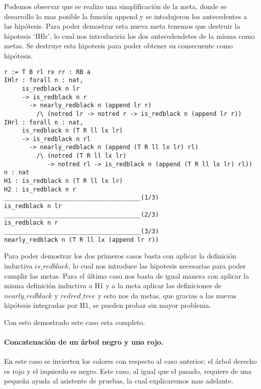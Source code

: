Podemos observar que se realizo una simplificaci\'on de la meta, donde se desarrollo lo mas
posible la funci\'on append y se intodujeron los antecedentes a las hip\'otesis. Para poder
demostrar esta nueva meta tenemos que destruir la hipotesis `IHlr', lo cual nos introduciria los
dos antecedendetes de la misma como metas. Se destruye esta hipotesis para poder obtener su consecuente como hip\'otesis.

\begin{verbatim}
r := T B rl rx rr : RB a
IHlr : forall n : nat,
     is_redblack n lr
     -> is_redblack n r
       -> nearly_redblack n (append lr r)
         /\ (notred lr -> notred r -> is_redblack n (append lr r))
IHrl : forall n : nat,
     is_redblack n (T R ll lx lr)
     -> is_redblack n rl
       -> nearly_redblack n (append (T R ll lx lr) rl)
         /\ (notred (T R ll lx lr)
            -> notred rl -> is_redblack n (append (T R ll lx lr) rl))
n : nat
H1 : is_redblack n (T R ll lx lr)
H2 : is_redblack n r
______________________________________(1/3)
is_redblack n lr
______________________________________(2/3)
is_redblack n r
______________________________________(3/3)
nearly_redblack n (T R ll lx (append lr r))
\end{verbatim}

Para poder demostrar los dos primeros casos basta con aplicar la definici\'on inductiva
$is\_redblack$, lo cual nos introduce las hipotesis necesarias para poder cumplir las metas.
Para el \'ultimo caso nos basta de igual manera con aplicar la misma definici\'on inductiva a H1 y
a la meta aplicar las definiciones de $nearly\_redblack$ y $redred\_tree$ y esto nos da metas, que
gracias a las nuevas hip\'otesis integradas por H1, se pueden probar sin mayor problema.

Con esto demostrado este caso esta completo.

\paragraph{Concatenaci\'on de un \'arbol negro y uno rojo.}

En este caso se invierten los colores con respecto al caso anterior; el \'arbol derecho es rojo y
el izquierdo es negro. Este caso, al igual que el pasado, requiere de una pequeña ayuda al
asistente de pruebas, la cual explicaremos mas adelante.

